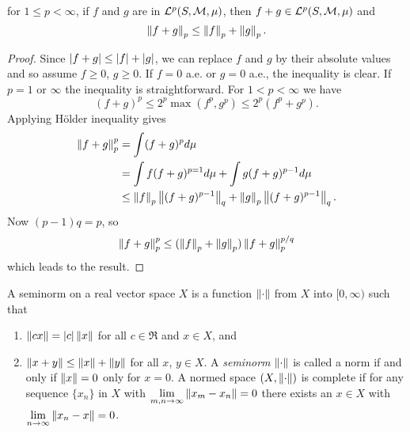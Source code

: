 \begin{theorem}[Minkowski's]
for $1\leq p<\infty$, if $f$ and $g$ are in $\mathcal L^p(S, \mathcal{M},\mu)$, then $f+g\in\mathcal L^p(S, \mathcal{M}, \mu)$ and
\begin{equation*}
\left\lVert f+g\right\rVert_p\leq \left\lVert f\right\rVert_p+\left\lVert g\right\rVert_p.
\end{equation*}
\end{theorem}



\begin{proof}
Since $\left\lvert f+g\right\rvert\leq\left\lvert f\right\rvert+\left\lvert g\right\rvert$, we can replace $f$ and $g$ by their absolute values and so assume $f\geq 0$, $g\geq 0$. If $f=0$ a.e. or $g=0$ a.e., the inequality is clear. If $p=1$ or $\infty$ the inequality is straightforward. For $1<p<\infty$ we have
\begin{equation*}
(f+g)^p\leq 2^p\max(f^p, g^p)\leq 2^p(f^p+g^p).
\end{equation*}
Applying Hölder inequality gives
\begin{align*}
\left\lVert f+g\right\rVert^p_p&=\int (f+g)^pd\mu\\
	&=\int f(f+g)^{p=1}d\mu + \int g(f+g)^{p-1}d\mu\\
	&\leq \left\lVert f\right\rVert_p\left\lVert(f+g)^{p-1}\right\rVert_q+\left\lVert g\right\rVert_p\left\lVert(f+g)^{p-1}\right\rVert_q.
\end{align*}
Now $(p-1)q=p$, so
\begin{equation*}
\left\lVert f+g\right\rVert^p_p\leq (\left\lVert f\right\rVert_p+\left\lVert g\right\rVert_p)\left\lVert f+g\right\rVert_p^{p/q}
\end{equation*}
which leads to the result.
\end{proof}




\begin{definition}[Seminorm]
A seminorm on a real vector space $X$ is a function $\left\lVert\cdot\right\rVert$ from $X$ into $[0,\infty)$ such that
\begin{enumerate}
\item $\left\lVert cx\right\rVert=\left\lvert c\right\rvert\left\lVert x\right\rVert$ for all $c\in \Re$ and $x\in X$, and
\item $\left\lVert x+y\right\rVert\leq \left\lVert x\right\rVert+\left\lVert y\right\rVert$ for all $x$, $y\in X$. A \emph{seminorm} $\left\lVert\cdot\right\rVert$ is called a norm if and only if $\left\lVert x\right\rVert=0$ only for $x=0$. A normed space $(X, \left\lVert\cdot\right\rVert)$ is complete if for any sequence $\{x_n\}$ in $X$ with $\lim\limits_{m,n\to\infty}\left\lVert x_m-x_n\right\rVert=0$ there exists an $x\in X$ with $\lim\limits_{n\to\infty}\left\lVert x_n-x\right\rVert=0$.
\end{enumerate}
\end{definition}



